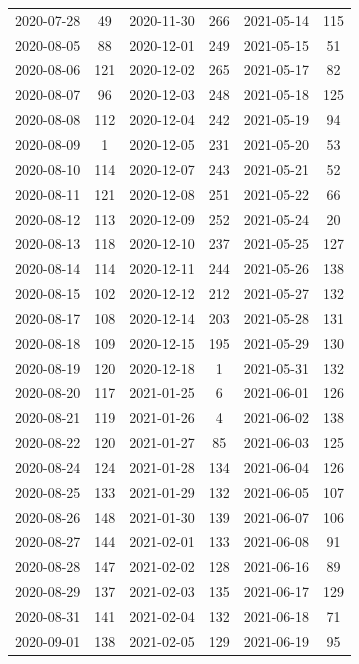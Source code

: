 \begin{table}[ht]
\begin{tabular}{|cc|cc|cc}
  2020-07-28 & 49 & 2020-11-30 & 266 & 2021-05-14 & 115 \\ 
  2020-08-05 & 88 & 2020-12-01 & 249 & 2021-05-15 & 51 \\ 
  2020-08-06 & 121 & 2020-12-02 & 265 & 2021-05-17 & 82 \\ 
  2020-08-07 & 96 & 2020-12-03 & 248 & 2021-05-18 & 125 \\ 
  2020-08-08 & 112 & 2020-12-04 & 242 & 2021-05-19 & 94 \\ 
  2020-08-09 & 1 & 2020-12-05 & 231 & 2021-05-20 & 53 \\ 
  2020-08-10 & 114 & 2020-12-07 & 243 & 2021-05-21 & 52 \\ 
  2020-08-11 & 121 & 2020-12-08 & 251 & 2021-05-22 & 66 \\ 
  2020-08-12 & 113 & 2020-12-09 & 252 & 2021-05-24 & 20 \\ 
  2020-08-13 & 118 & 2020-12-10 & 237 & 2021-05-25 & 127 \\ 
  2020-08-14 & 114 & 2020-12-11 & 244 & 2021-05-26 & 138 \\ 
  2020-08-15 & 102 & 2020-12-12 & 212 & 2021-05-27 & 132 \\ 
  2020-08-17 & 108 & 2020-12-14 & 203 & 2021-05-28 & 131 \\ 
  2020-08-18 & 109 & 2020-12-15 & 195 & 2021-05-29 & 130 \\ 
  2020-08-19 & 120 & 2020-12-18 & 1 & 2021-05-31 & 132 \\ 
  2020-08-20 & 117 & 2021-01-25 & 6 & 2021-06-01 & 126 \\ 
  2020-08-21 & 119 & 2021-01-26 & 4 & 2021-06-02 & 138 \\ 
  2020-08-22 & 120 & 2021-01-27 & 85 & 2021-06-03 & 125 \\ 
  2020-08-24 & 124 & 2021-01-28 & 134 & 2021-06-04 & 126 \\ 
  2020-08-25 & 133 & 2021-01-29 & 132 & 2021-06-05 & 107 \\ 
  2020-08-26 & 148 & 2021-01-30 & 139 & 2021-06-07 & 106 \\ 
  2020-08-27 & 144 & 2021-02-01 & 133 & 2021-06-08 & 91 \\ 
  2020-08-28 & 147 & 2021-02-02 & 128 & 2021-06-16 & 89 \\ 
  2020-08-29 & 137 & 2021-02-03 & 135 & 2021-06-17 & 129 \\ 
  2020-08-31 & 141 & 2021-02-04 & 132 & 2021-06-18 & 71 \\ 
  2020-09-01 & 138 & 2021-02-05 & 129 & 2021-06-19 & 95 \\ 

\end{tabular}
\end{table}
